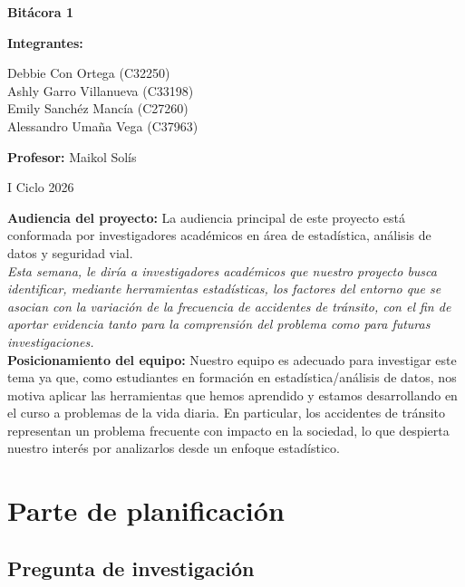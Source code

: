 \documentclass[12pt]{article}
\begin{document}
\begin{titlepage}
\centering
\vspace*{\fill}

{\Huge\bfseries Bitácora 1\par}
\vspace{1.5cm}

{\Large\textbf{Integrantes:}\par}
Debbie Con Ortega (C32250)\\
Ashly Garro Villanueva (C33198)\\
Emily Sanchéz Mancía (C27260)\\
Alessandro Umaña Vega (C37963)

\vspace{1cm}

{\Large\textbf{Profesor:} Maikol Solís\par}
\vspace{1.5cm}

{\Large I Ciclo 2026\par}

\vspace*{\fill}
\end{titlepage}
\newpage

\textbf{Audiencia del proyecto:} La audiencia principal de este proyecto está conformada por
investigadores académicos en área de estadística, análisis de datos y seguridad vial. \\
\textit{Esta semana, le diría a investigadores académicos que nuestro proyecto busca identificar, mediante
herramientas estadísticas, los factores del entorno que se asocian con la variación de la frecuencia
de accidentes de tránsito, con el fin de aportar evidencia tanto para la comprensión del problema como para futuras investigaciones.}\\

\textbf{Posicionamiento del equipo:}
Nuestro equipo es adecuado para investigar este tema ya que, como estudiantes en formación en estadística/análisis
de datos, nos motiva aplicar las herramientas que hemos aprendido y estamos desarrollando en el curso a problemas de
la vida diaria.
En particular, los accidentes de tránsito representan un problema frecuente con impacto en la sociedad, lo que despierta
nuestro interés por analizarlos desde un enfoque estadístico.

\section{Parte de planificación}
\subsection{Pregunta de investigación}
\end{document}
